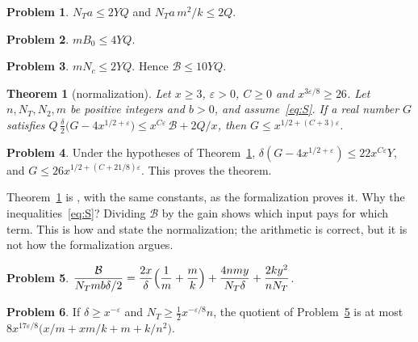 \documentclass[reqno]{amsart}
\theoremstyle{definition}
\newtheorem{problem}{Problem}[section]
\theoremstyle{plain}
\newtheorem{theorem}{Theorem}[section]
\newcommand{\Bc}{\mathcal{B}}
\begin{document}
\begin{problem}\label{pr:size-ends}
\(N_Ta \le 2YQ\) and \(N_Ta\,m^2/k \le 2Q\).
\end{problem}

\begin{problem}\label{pr:size-steps}
\(mB_0 \le 4YQ\).
\end{problem}

\begin{problem}\label{pr:size-defects}
\(mN_c \le 2YQ\).  Hence \(\Bc \le 10YQ\).
\end{problem}

\begin{theorem}[normalization]\label{thm:size}
Let \(x \ge 3\), \(\varepsilon > 0\), \(C \ge 0\) and \(x^{3\varepsilon/8} \ge 26\).  Let \(n, N_T, N_2, m\) be positive integers and \(b > 0\), and assume~\eqref{eq:S}.  If a real number \(G\) satisfies
\(
  Q\,\frac{\delta}{2}\bigl(G - 4x^{1/2+\varepsilon}\bigr) \le x^{C\varepsilon}\,\Bc + 2Q/x
\),
then \(G \le x^{1/2+(C+3)\varepsilon}\).
\end{theorem}

\begin{problem}\label{pr:size-divide}
Under the hypotheses of Theorem~\ref{thm:size}, \(\delta(G - 4x^{1/2+\varepsilon}) \le 22x^{C\varepsilon}Y\), and \(G \le 26x^{1/2+(C+21/8)\varepsilon}\).  This proves the theorem.
\end{problem}

Theorem~\ref{thm:size} is \cite[Lemma~6.1]{Zh}, with the same constants, as the formalization proves it.  Why the inequalities~\eqref{eq:S}?  Dividing \(\Bc\) by the gain shows which input pays for which term.  This is how \cite[\S4.3]{Adr} and \cite[\S I.5, (M), and \S I.6, Thm.~A]{Rub} state the normalization; the arithmetic is correct, but it is not how the formalization argues.

\begin{problem}\label{pr:divide}
\(\displaystyle \frac{\Bc}{N_Tmb\delta/2} = \frac{2x}{\delta}\Bigl(\frac1m + \frac mk\Bigr) + \frac{4nmy}{N_T\delta} + \frac{2ky^2}{nN_T}\).
\end{problem}

\begin{problem}\label{pr:four}
If \(\delta \ge x^{-\varepsilon}\) and \(N_T \ge \frac12 x^{-\varepsilon/8}n\), the quotient of Problem~\ref{pr:divide} is at most \(8x^{17\varepsilon/8}\bigl(x/m + xm/k + m + k/n^2\bigr)\).
\end{problem}
\end{document}
